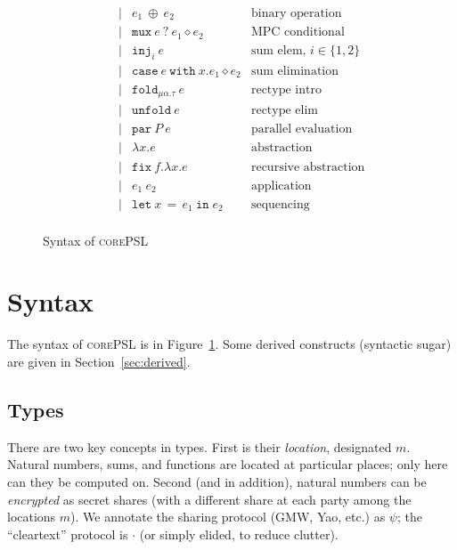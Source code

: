 \documentclass[10pt]{article}
\newcommand{\kw}[1]{\ensuremath{\mathtt{#1}}}
\newcommand{\trec}[2]{\ensuremath{\mu {#1}.{#2}}}
\newcommand{\ebinop}[2]{\ensuremath{{#1}~\oplus~{#2}}}
\newcommand{\elet}[3]{\ensuremath{\kw{let}~#1\, =\, #2~\kw{in}\;{#3}}}
\newcommand{\epar}[2]{\ensuremath{\kw{par}~{#1}~{#2}}}
\newcommand{\econd}[3]{\ensuremath{\kw{case}~{#1}~\kw{with}~x.{#2} \diamond {#3}}}
\newcommand{\emux}[3]{\ensuremath{\kw{mux}~{#1}~\kw{?}~{#2} \diamond {#3}}}
\newcommand{\einj}[2]{\ensuremath{\kw{inj}_{#1}~{#2}}}
\newcommand{\elam}[2]{\ensuremath{\lambda {#1}.{#2}}}
\newcommand{\eapp}[2]{\ensuremath{{#1}~{#2}}}
\newcommand{\efix}[3]{\ensuremath{\kw{fix}~{#1}.\elam{#2}{#3}}}
\newcommand{\efold}[2]{\ensuremath{\kw{fold}_{#1}~{#2}}}
\newcommand{\eunfold}[1]{\ensuremath{\kw{unfold}~{#1}}}
\newcommand{\lang}{\textsc{corePSL}\xspace}
\begin{document}
\begin{figure}[h]
\[\begin{array}{rlcll}
                       && \mid & \ebinop{e_1}{e_2}  & \text{binary operation} \\
                       && \mid & \emux{e}{e_1}{e_2}  & \text{MPC conditional} \\
                       && \mid & \einj{i}{e} & \text{sum elem, }i \in \{1,2\}\\
                       && \mid & \econd{e}{e_1}{e_2}  & \text{sum elimination} \\
                       && \mid & \efold{\trec{\alpha}{\tau}}{e} & \text{rectype intro}\\
                       && \mid & \eunfold{e} & \text{rectype elim}\\
                       && \mid & \epar{P}{e} & \text{parallel evaluation}\\
                       && \mid & \elam{x}{e}  & \text{abstraction} \\
                       && \mid & \efix{f}{x}{e} & \text{recursive abstraction} \\
                       && \mid & \eapp{e_1}{e_2}  & \text{application} \\
                       && \mid & \elet{x}{e_1}{e_2}  & \text{sequencing} \\
  \end{array}
  \]
  \caption{Syntax of \lang}
  \label{fig:syntax}
\end{figure}

\newpage

\section{Syntax}
\label{sec:syntax}

The syntax of \lang is in Figure~\ref{fig:syntax}. Some derived
constructs (syntactic sugar) are given in Section~\ref{sec:derived}.

\subsection{Types}

There are two key concepts in types. First is their \emph{location},
designated $m$. Natural numbers, sums, and functions are located at
particular places; only here can they be computed on. Second (and in
addition), natural numbers can be \emph{encrypted} as secret
shares (with a different share at each party among the locations
$m$). We annotate the sharing protocol (GMW, Yao, etc.) as $\psi$; the
``cleartext'' protocol is $\cdot$ (or simply elided, to reduce
clutter).
\end{document}
